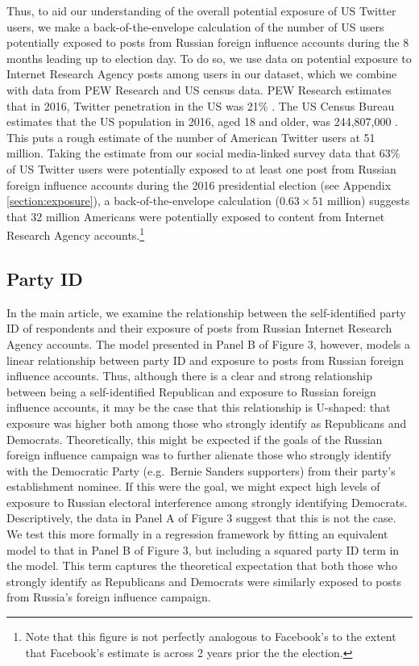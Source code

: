\documentclass[
  12pt,
]{article}
\begin{document}
Thus, to aid our understanding of the overall potential exposure of US Twitter users, we make a back-of-the-envelope calculation of the number of US users potentially exposed to posts from Russian foreign influence accounts during the 8 months leading up to election day. To do so, we use data on potential exposure to Internet Research Agency posts among users in our dataset, which we combine with data from PEW Research and US census data. PEW Research estimates that in 2016, Twitter penetration in the US was 21\% \citep{Greenwood2016}. The US Census Bureau estimates that the US population in 2016, aged 18 and older, was 244,807,000 \citep{Census2016}. This puts a rough estimate of the number of American Twitter users at 51 million. Taking the estimate from our social media-linked survey data that 63\% of US Twitter users were potentially exposed to at least one post from Russian foreign influence accounts during the 2016 presidential election (see Appendix \ref{section:exposure}), a back-of-the-envelope calculation (\(0.63 \times 51\) million) suggests that 32 million Americans were potentially exposed to content from Internet Research Agency accounts.\footnote{Note that this figure is not perfectly analogous to Facebook's to the extent that Facebook's estimate is across 2 years prior the the election.}

\clearpage

\hypertarget{party-id}{%
\subsection{Party ID}\label{party-id}}

In the main article, we examine the relationship between the self-identified party ID of respondents and their exposure of posts from Russian Internet Research Agency accounts. The model presented in Panel B of Figure 3, however, models a linear relationship between party ID and exposure to posts from Russian foreign influence accounts. Thus, although there is a clear and strong relationship between being a self-identified Republican and exposure to Russian foreign influence accounts, it may be the case that this relationship is U-shaped: that exposure was higher both among those who strongly identify as Republicans and Democrats. Theoretically, this might be expected if the goals of the Russian foreign influence campaign was to further alienate those who strongly identify with the Democratic Party (e.g.~Bernie Sanders supporters) from their party's establishment nominee. If this were the goal, we might expect high levels of exposure to Russian electoral interference among strongly identifying Democrats. Descriptively, the data in Panel A of Figure 3 suggest that this is not the case. We test this more formally in a regression framework by fitting an equivalent model to that in Panel B of Figure 3, but including a squared party ID term in the model. This term captures the theoretical expectation that both those who strongly identify as Republicans and Democrats were similarly exposed to posts from Russia's foreign influence campaign.
\end{document}
